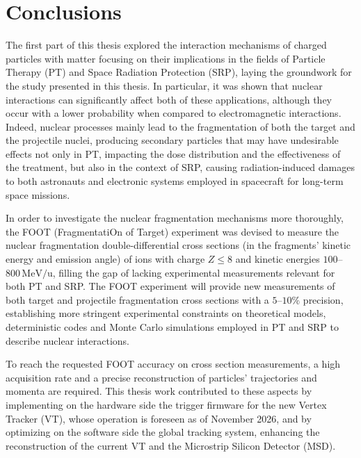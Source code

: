 \cleardoublepage
\chapter*{Conclusions}\label{ch:conclusions}
The first part of this thesis explored the interaction mechanisms of charged particles with matter focusing on their implications in the fields of Particle Therapy (PT) and Space Radiation Protection (SRP), laying the groundwork for the study presented in this thesis. In particular, it was shown that nuclear interactions can significantly affect both of these applications, although they occur with a lower probability when compared to electromagnetic interactions. Indeed, nuclear processes mainly lead to the fragmentation of both the target and the projectile nuclei, producing secondary particles that may have undesirable effects not only in PT, impacting the dose distribution and the effectiveness of the treatment, but also in the context of SRP, causing radiation-induced damages to both astronauts and electronic systems employed in spacecraft for long-term space missions.

In order to investigate the nuclear fragmentation mechanisms more thoroughly, the FOOT (FragmentatiOn of Target) experiment was devised to measure the nuclear fragmentation double-differential cross sections (in the fragments' kinetic energy and emission angle) of ions with charge $Z\leq8$ and kinetic energies $100$--$800\,\mathrm{MeV/u}$, filling the gap of lacking experimental measurements relevant for both PT and SRP. The FOOT experiment will provide new measurements of both target and projectile fragmentation cross sections with a $5$--$10\%$ precision, establishing more stringent experimental constraints on theoretical models, deterministic codes and Monte Carlo simulations employed in PT and SRP to describe nuclear interactions.

To reach the requested FOOT accuracy on cross section measurements, a high acquisition rate and a precise reconstruction of particles' trajectories and momenta are required. This thesis work contributed to these aspects by implementing on the hardware side the trigger firmware for the new Vertex Tracker (VT), whose operation is foreseen as of November 2026, and by optimizing on the software side the global tracking system, enhancing the reconstruction of the current VT and the Microstrip Silicon Detector (MSD).

